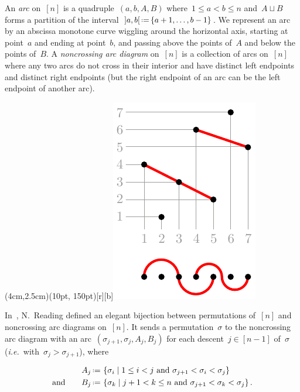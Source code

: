 \documentclass{amsart}
\theoremstyle{definition}
\newcommand{\set}[2]{\left\{ #1 \;\middle|\; #2 \right\}} %
\newcommand{\eqdef}{\mbox{\,\raisebox{0.2ex}{\scriptsize\ensuremath{\mathrm:}}\ensuremath{=}\,}} %
\newcommand{\ie}{\textit{i.e.}~} %
\newcommand{\darkblue}{\color{darkblue}} %
\newcommand{\defn}[1]{\textsl{\darkblue #1}} %
\begin{document}
An \defn{arc} on~$[n]$ is a quadruple~$(a, b, A, B)$ where~$1 \le a < b \le n$ and~$A \sqcup B$ forms a partition of the interval~${]a,b[} \eqdef \{a+1, \dots, b-1\}$.
We represent an arc by an abscissa monotone curve wiggling around the horizontal axis, starting at point~$a$ and ending at point~$b$, and passing above the points of~$A$ and below the points of~$B$.
A \defn{noncrossing arc diagram} on~$[n]$ is a collection of arcs on~$[n]$ where any two arcs do not cross in their interior and have distinct left endpoints and distinct right endpoints (but the right endpoint of an arc can be the left endpoint of another arc).

\vspace{-.1cm}
\parpic(4cm,2.5cm)(10pt, 150pt)[r][b]{\includegraphics[scale=.9]{arcDiagram}}{
In~\cite{Reading-arcDiagrams}, N.~Reading defined an elegant bijection between permutations of~$[n]$ and noncrossing arc diagrams on~$[n]$.
It sends a permutation~$\sigma$ to the noncrossing arc diagram with an arc~$(\sigma_{j+1}, \sigma_j, A_j, B_j)$ for each descent~$j \in [n-1]$ of~$\sigma$ (\ie with~$\sigma_j > \sigma_{j+1}$), where

\vspace{-.2cm}
\begin{minipage}{10cm}
\begin{align*}
A_j & \eqdef \set{\sigma_i}{1 \le i < j \text{ and } \sigma_{j+1} < \sigma_i < \sigma_j} \\
\text{and} \qquad
B_j & \eqdef \set{\sigma_k}{j+1 < k \le n \text{ and } \sigma_{j+1} < \sigma_k < \sigma_j}.
\end{align*}
\end{minipage}

}
\end{document}
